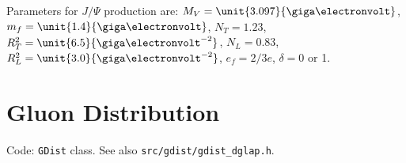 \documentclass[a4paper,12pt]{article}
\newcommand{\code}[1]{\texttt{#1}}
\begin{document}
Parameters for $J/\Psi$ production are: $M_V = \unit{3.097}{\giga\electronvolt}$, $m_f = \unit{1.4}{\giga\electronvolt}$, $N_T = 1.23$, $R_T^2 = \unit{6.5}{\giga\electronvolt^{-2}}$, $N_L=0.83$, $R_L^2 = \unit{3.0}{\giga\electronvolt^{-2}}$, $e_f = 2/3 e$, $\delta = 0$ or 1.


\section{Gluon Distribution}
\label{gdist}
Code: \code{GDist} class. See also \code{src/gdist/gdist\_dglap.h}.


\end{document}
